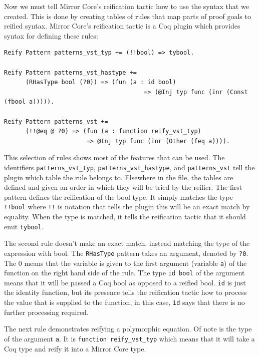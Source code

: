 \documentclass{puthesis}
\begin{document}
Now we must tell Mirror Core's reification tactic
\cite[section~4.4.1]{malecha:thesis} how to use the syntax that we
created. This is done by creating tables of rules that map parts of
proof goals to reified syntax. Mirror Core's reification tactic is a
Coq plugin which provides syntax for defining these rules:

\begin{lstlisting}
Reify Pattern patterns_vst_typ += (!!bool) => tybool.

Reify Pattern patterns_vst_hastype += 
      (RHasType bool (?0)) => (fun (a : id bool) 
                                       => (@Inj typ func (inr (Const (fbool a))))).

Reify Pattern patterns_vst += 
      (!!@eq @ ?0) => (fun (a : function reify_vst_typ) 
                       => @Inj typ func (inr (Other (feq a)))).
\end{lstlisting}

This selection of rules shows most of the features that can be
used. The identifiers \lstinline|patterns_vst_typ|,
\lstinline|patterns_vst_hastype|, and \lstinline|patterns_vst| tell the
plugin which table the rule belongs to. Elsewhere in the file, the
tables are defined and given an order in which they will be tried by
the reifier. The first pattern defines the reification of the bool
type. It simply matches the type \lstinline|!!bool| where
\lstinline|!!| is notation that tells the plugin this will be an exact
match by equality. When the type is matched, it tells the reification
tactic that it should emit \lstinline|tybool|.

The second rule doesn't make an exact match, instead matching the type
of the expression with bool. The \lstinline|RHasType| pattern takes an
argument, denoted by \lstinline|?0|. The 0 means that the variable is
given to the first argument (variable \lstinline|a|) of the function
on the right hand side of the rule. The type \lstinline|id bool| of
the argument means that it will be passed a Coq bool as opposed to a
reified bool. \lstinline|id| is just the identity function, but its
presence tells the reification tactic how to process the value that is
supplied to the function, in this case, \lstinline|id| says that there
is no further processing required.  

The next rule demonstrates reifying a polymorphic equation. Of note is
the type of the argument \lstinline|a|. It is 
\lstinline|function reify_vst_typ| which means that it will take a Coq
type and reify it into a Mirror Core type.
\end{document}
